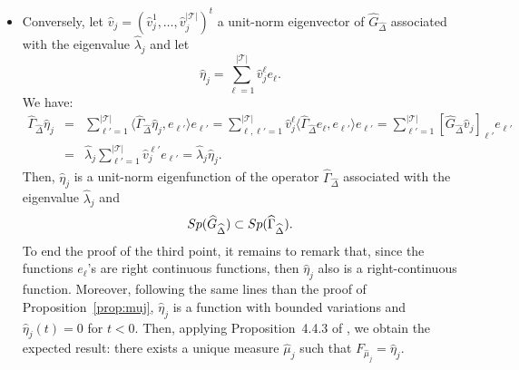 \documentclass[aos]{imsart}
\theoremstyle{plain}
\theoremstyle{remark}
\newcommand{\1}{1}
\begin{document}
\begin{itemize}
\[\]
\item Conversely, let $\widehat v_j=(\widehat v_j^1,\hdots,\widehat v_j^{|\mathcal{T}|})^t$ a unit-norm eigenvector of $\widehat G_{\widehat\Delta}$ associated with the eigenvalue $\widehat\lambda_j$ and let
	$$
	\widehat\eta_j = \sum_{\ell=1}^{|\mathcal{T}|}\widehat v_j^\ell e_\ell. 
	$$
We have:	
\begin{eqnarray*}
\widehat\Gamma_{\widehat\Delta}\widehat\eta_j  &=& \sum_{\ell'=1}^{|\mathcal T|}\langle\widehat\Gamma_{\widehat\Delta}\widehat\eta_j , e_{\ell'}\rangle e_{\ell'} =\sum_{\ell,\ell'=1}^{|\mathcal T|}\widehat v_j^\ell \langle\widehat\Gamma_{\widehat\Delta}e_\ell,e_{\ell'}\rangle e_{\ell'} = \sum_{\ell'=1}^{|\mathcal T|}\left[\widehat G_{\widehat\Delta}\widehat v_j\right]_{\ell'}e_{\ell'} \\
&=&\widehat\lambda_j\sum_{\ell'=1}^{|\mathcal T|}\widehat v_j^{\ell'} e_{\ell'} = \widehat\lambda_j\widehat\eta_j . 
\end{eqnarray*}
	Then, $\widehat\eta_j$ is a unit-norm eigenfunction of the operator $\widehat\Gamma_{\widehat\Delta}$ associated with the eigenvalue $\widehat\lambda_j$
 and 
\[{\rm Sp}(\widehat G_{\widehat\Delta})\subset
{\rm Sp}(\widehat\Gamma_{\widehat\Delta}). 
\]
To end the proof of the third point, it remains to remark that, since the functions $e_\ell$'s are right continuous functions, then $\widehat\eta_j$ also is a right-continuous function. Moreover, following the same lines than the proof of Proposition~\ref{prop:muj}, $\widehat\eta_j$ is a function with bounded variations and $\widehat\eta_j(t)=0$ for $t<0$. Then, applying Proposition~4.4.3 of \cite{Cohn93}, we obtain the expected result: there exists a unique measure $\widehat\mu_j$ such that  $F_{\widehat\mu_j} = \widehat\eta_j. $
\end{itemize}
% 

\end{document}
